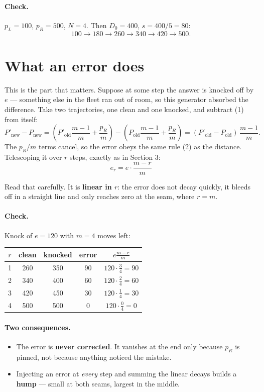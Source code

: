 \documentclass[11pt]{article}
\begin{document}
\paragraph{Check.} $p_L=100$, $p_R=500$, $N=4$. Then $D_0=400$, $s=400/5=80$:
\[
100 \to 180 \to 260 \to 340 \to 420 \to 500 .
\]

\section{What an error does}

This is the part that matters. Suppose at some step the answer is knocked off by
$e$ --- something else in the fleet ran out of room, so this generator absorbed
the difference. Take two trajectories, one clean and one knocked, and subtract
(1) from itself:
\[
P'_{\text{new}} - P_{\text{new}}
= \left(P'_{\text{old}}\frac{m-1}{m} + \frac{p_R}{m}\right)
- \left(P_{\text{old}}\frac{m-1}{m} + \frac{p_R}{m}\right)
= (P'_{\text{old}} - P_{\text{old}})\,\frac{m-1}{m}.
\]
The $p_R/m$ terms cancel, so the error obeys the same rule (2) as the distance.
Telescoping it over $r$ steps, exactly as in Section 3:
\[
\boxed{\;e_r = e\cdot\frac{m-r}{m}\;}
\]

Read that carefully. It is \textbf{linear in $r$}: the error does not decay
quickly, it bleeds off in a straight line and only reaches zero at the seam,
where $r=m$.

\paragraph{Check.} Knock of $e=120$ with $m=4$ moves left:
\begin{center}
\begin{tabular}{ccccc}
\toprule
$r$ & clean & knocked & error & $e\frac{m-r}{m}$ \\
\midrule
1 & 260 & 350 & 90 & $120\cdot\frac34 = 90$ \\
2 & 340 & 400 & 60 & $120\cdot\frac24 = 60$ \\
3 & 420 & 450 & 30 & $120\cdot\frac14 = 30$ \\
4 & 500 & 500 & 0 & $120\cdot\frac04 = 0$ \\
\bottomrule
\end{tabular}
\end{center}

\paragraph{Two consequences.}
\begin{itemize}
\item The error is \textbf{never corrected}. It vanishes at the end only because
      $p_R$ is pinned, not because anything noticed the mistake.
\item Injecting an error at \emph{every} step and summing the linear decays
      builds a \textbf{hump} --- small at both seams, largest in the middle.
\end{itemize}
\end{document}
